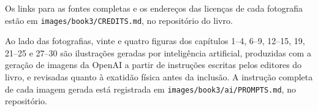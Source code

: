 Os links para as fontes completas e os endereços das licenças de cada
fotografia estão em \texttt{images/book3/CREDITS.md}, no repositório
do livro.

\bigskip
Ao lado das fotografias, vinte e quatro figuras dos capítulos 1--4,
6--9, 12--15, 19, 21--25 e 27--30 são ilustrações geradas por
inteligência artificial, produzidas com a geração de imagens da
OpenAI a partir de instruções escritas pelos editores do livro, e
revisadas quanto à exatidão física antes da inclusão. A instrução
completa de cada imagem gerada está registrada em
\texttt{images/book3/ai/PROMPTS.md}, no repositório.
\clearpage
